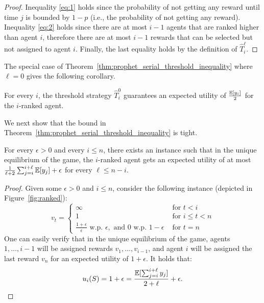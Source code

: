 \begin{proof}
	
	Inequality \eqref{eq:1} holds since the probability of not getting any reward until time $j$ is bounded by $1-p$ (i.e., the probability of not getting any reward). 
	Inequality \eqref{eq:2} holds since there are at most $i-1$ agents that are ranked higher than agent $i$, therefore there are at most $i-1$ rewards that can be selected but not assigned to agent $i$.
	Finally, the last equality holds by the definition of $\hat{T}_i^\ell$.		
\end{proof}

The special case of Theorem~\ref{thm:prophet_serial_threshold_inequality} where $\ell=0$ gives the following corollary.
\begin{corollary}
For every $i$, the threshold strategy $\hat{T}_i^0$ guarantees an expected utility of $\frac{\mathbb{E}[y_i]}{2}$ for the $i$-ranked agent.
\end{corollary}

We next show that the bound in Theorem~\ref{thm:prophet_serial_threshold_inequality} is tight.
\begin{proposition}\label{pro:lb_serial}
	For every $\epsilon>0$ and every $i \leq n$, there exists an instance such that in the unique equilibrium of the game, the $i$-ranked agent gets an expected utility of at most $\frac{1}{\ell+2}\sum_{j=i}^{i+\ell} \mathbb{E} [y_j]+\epsilon$ for every $\ell \leq n-i$.
\end{proposition}

\begin{proof}
	Given some $\epsilon>0$ and $i \leq n$, consider the following instance (depicted in Figure~\ref{fig:ranked}): 
	$$
	v_t = 
	\begin{cases}
	\infty & \text{ for } t < i\\
	1 & \text{ for } i \leq t < n \\
	\frac{1+\epsilon}{\epsilon} \mbox{ w.p. } \epsilon, \mbox{ and } 0  \mbox{ w.p. } 1-\epsilon& \text{ for } t = n
	\end{cases}
	$$
	One can easily verify that in the unique equilibrium of the game, agents $1, \ldots, i-1$ will be assigned rewards $v_1,\ldots,v_{i-1}$, and agent $i$ will be assigned the last reward $v_n$ for an expected utility of $1+\epsilon$.
	It holds that:
	$$ u_i(S) = 1+\epsilon = \frac{\mathbb{E}[\sum_{j=i}^{i+\ell}y_j]}{2+\ell}+\epsilon.$$
\end{proof}

